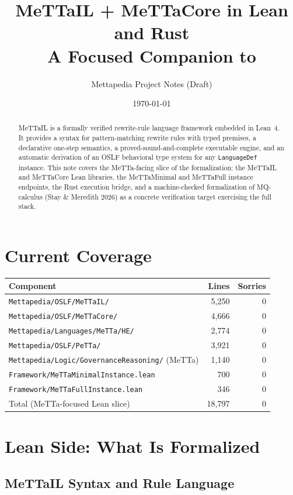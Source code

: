 \documentclass[11pt]{article}
\title{MeTTaIL + MeTTaCore in Lean and Rust\\
\large A Focused Companion to \code{leanOSLF.tex}}
\author{Mettapedia Project Notes (Draft)}
\date{\today}
\newcommand{\code}[1]{\texttt{#1}}
\begin{document}
\maketitle

\begin{abstract}
MeTTaIL is a formally verified rewrite-rule language framework embedded in Lean~4.
It provides a syntax for pattern-matching rewrite rules with typed premises, a
declarative one-step semantics, a proved-sound-and-complete executable engine,
and an automatic derivation of an OSLF behavioral type system for any
\code{LanguageDef} instance.  This note covers the MeTTa-facing slice of the
formalization: the MeTTaIL and MeTTaCore Lean libraries, the MeTTaMinimal and
MeTTaFull instance endpoints, the Rust execution bridge, and a machine-checked
formalization of MQ-calculus (Stay \& Meredith 2026) as a concrete verification
target exercising the full stack.
\end{abstract}

\section{Current Coverage}

\begin{longtable}{lrr}
\toprule
Component & Lines & Sorries \\
\midrule
\endhead
\code{Mettapedia/OSLF/MeTTaIL/} & 5,250 & 0 \\
\code{Mettapedia/OSLF/MeTTaCore/} & 4,666 & 0 \\
\code{Mettapedia/Languages/MeTTa/HE/} & 2,774 & 0 \\
\code{Mettapedia/OSLF/PeTTa/} & 3,921 & 0 \\
\code{Mettapedia/Logic/GovernanceReasoning/} (MeTTa) & 1,140 & 0 \\
\code{Framework/MeTTaMinimalInstance.lean} & 700 & 0 \\
\code{Framework/MeTTaFullInstance.lean} & 346 & 0 \\
\midrule
Total (MeTTa-focused Lean slice) & 18,797 & 0 \\
\bottomrule
\end{longtable}

\section{Lean Side: What Is Formalized}

\subsection{MeTTaIL Syntax and Rule Language}
\end{document}
